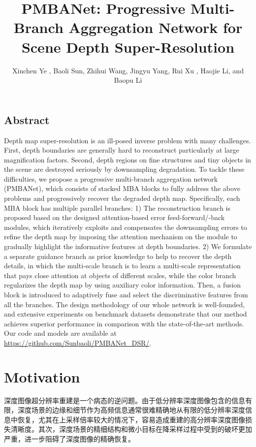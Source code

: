 \documentclass{vip-theme}
\title{PMBANet: Progressive Multi-Branch Aggregation Network for Scene Depth Super-Resolution}
\author{
	Xinchen Ye , Baoli Sun, Zhihui Wang, Jingyu Yang, Rui Xu , Haojie Li, and Baopu Li %
}
\begin{document}
\maketitle
\label{title}

\vspace{0.5em}
\subsection*{Abstract} 
\label{abstract}
Depth map super-resolution is an ill-posed inverse problem with many challenges. First, depth boundaries are generally hard to reconstruct particularly at large magnification factors. Second, depth regions on fine structures and tiny objects in the scene are destroyed seriously by downsampling degradation. To tackle these difficulties, we propose a progressive multi-branch aggregation network (PMBANet), which consists of stacked MBA blocks to fully address the above problems and progressively recover the degraded depth map. Specifically, each MBA block has multiple parallel branches: 1) The reconstruction branch is proposed based on the designed attention-based error feed-forward/-back modules, which iteratively exploits and compensates the downsampling errors to refine the depth map by imposing the attention mechanism on the module to gradually highlight the informative features at depth boundaries. 2) We formulate a separate guidance branch as prior knowledge to help to recover the depth details, in which the multi-scale branch is to learn a multi-scale representation that pays close attention at objects of different scales, while the color branch regularizes the depth map by using auxiliary color information. Then, a fusion block is introduced to adaptively fuse and select the discriminative features from all the branches. The design methodology of our whole network is well-founded, and extensive experiments on benchmark datasets demonstrate that our method achieves superior performance in comparison with the state-of-the-art methods. Our code and models are available at \href{https://github.com/Sunbaoli/PMBANet\_DSR/}{https://github.com/Sunbaoli/PMBANet\_DSR/}.


\section{Motivation}
\label{motivation}

深度图像超分辨率重建是一个病态的逆问题。由于低分辨率深度图像包含的信息有限，深度场景的边缘和细节作为高频信息通常很难精确地从有限的低分辨率深度信息中恢复，尤其在上采样倍率较大的情况下，容易造成重建的高分辨率深度图像损失清晰度。其次，深度场景的精细结构和微小目标在降采样过程中受到的破坏更加严重，进一步阻碍了深度图像的精确恢复。
\end{document}
